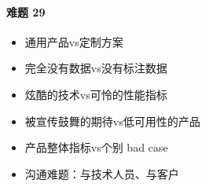 \documentclass[letterpaper,10pt,english]{sphinxmanual}
\begin{document}
\paragraph{难题 29\sphinxfootnotemark[301]}
\label{\detokenize{chapter_introduction/AI_PM:id33}}%
\begin{footnotetext}[301]\sphinxAtStartFootnote
{}
%
\end{footnotetext}\ignorespaces \begin{itemize}
\item {} 
通用产品vs定制方案

\item {} 
完全没有数据vs没有标注数据

\item {} 
炫酷的技术vs可怜的性能指标

\item {} 
被宣传鼓舞的期待vs低可用性的产品

\item {} 
产品整体指标vs个别 bad case

\item {} 
沟通难题：与技术人员、与客户

\end{itemize}
\end{document}
